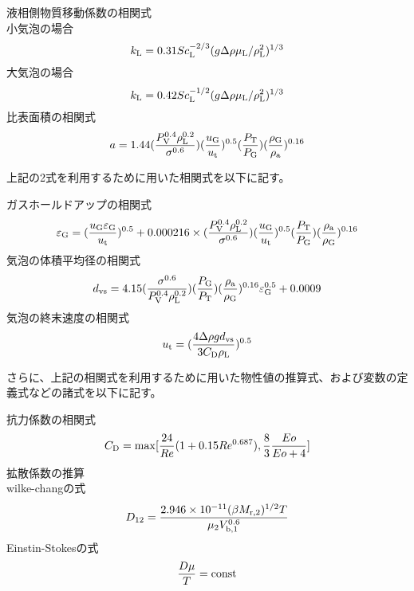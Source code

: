 \documentclass[a4j]{jsreport}
\begin{document}
液相側物質移動係数の相関式\\
小気泡の場合
\begin{equation}
    k_{{\rm L}} = 0.31Sc_{{\rm L}}^{-2/3}(g \Delta \rho \mu_{{\rm L}}/\rho_{{\rm L}}^2)^{1/3}
\end{equation}
大気泡の場合
\begin{equation}
    k_{{\rm L}} = 0.42Sc_{{\rm L}}^{-1/2}(g \Delta \rho \mu_{{\rm L}}/\rho_{{\rm L}}^2)^{1/3}
\end{equation}
比表面積の相関式
\begin{equation}
    a = 1.44(\frac{P_{{\rm V}}^{0.4} \rho_{{\rm L}}^{0.2} }{ \sigma^{0.6}})(\frac{u_{{\rm G}}}{u_{{\rm t}}})^{0.5}(\frac{P_{{\rm T}}}{P_{{\rm G}}})(\frac{\rho_{{\rm G}}}{\rho_{{\rm a}}})^{0.16}
\end{equation}

上記の2式を利用するために用いた相関式を以下に記す。

ガスホールドアップの相関式
\begin{equation}
    \varepsilon_{{\rm G}} = (\frac{u_{{\rm G}}\varepsilon_{{\rm G}}}{u_{{\rm t}}}) ^{0.5} + 0.000216 \times(\frac{P_{{\rm V}}^{0.4} \rho_{{\rm L}}^{0.2} }{ \sigma^{0.6}})(\frac{u_{{\rm G}}}{u_{{\rm t}}})^{0.5}(\frac{P_{{\rm T}}}{P_{{\rm G}}})(\frac{\rho_{{\rm a}}}{\rho_{{\rm G}}})^{0.16}
\end{equation}
気泡の体積平均径の相関式
\begin{equation}
    d_{{\rm vs}} = 4.15 (\frac{\sigma^{0.6}}{P_{{\rm V}}^{0.4} \rho_{{\rm L}}^{0.2}})(\frac{P_{{\rm G}}}{P_{{\rm T}}})(\frac{\rho_{{\rm a}}}{\rho_{{\rm G}}})^{0.16} \varepsilon_{{\rm G}}^{0.5} + 0.0009
\end{equation}
気泡の終末速度の相関式
\begin{equation}
    u_{{\rm t}} = (\frac{4\Delta \rho g d_{{\rm vs}}}{3C_{{\rm D}}\rho_{{\rm L}}})^{0.5}
\end{equation}

さらに、上記の相関式を利用するために用いた物性値の推算式、および変数の定義式などの諸式を以下に記す。

抗力係数の相関式
\begin{equation}
    C_{{\rm D}} = {\rm max}[\frac{24}{Re}(1+0.15Re^{0.687}), \frac{8}{3}\frac{Eo}{Eo+4}]
\end{equation}
拡散係数の推算\\
wilke-changの式
\begin{equation}
    D_{12} = \frac{2.946\times 10^{-11}(\beta M_{{\rm r,2}})^{1/2} T} {\mu_2 V_{{\rm b,1}}^{0.6}}
\end{equation}
Einstin-Stokesの式
\begin{equation}
    \frac{D \mu}{T} = {\rm const}
\end{equation}
\end{document}
